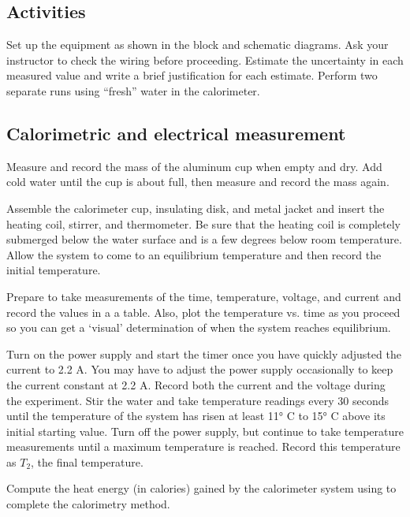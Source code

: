 \begin{multicols}{2}
\section{Activities}
Set up the equipment as shown in the block and schematic diagrams.  Ask your instructor to check the wiring before proceeding.  Estimate the uncertainty in each measured value and write a brief justification for each estimate. Perform two separate runs using ``fresh'' water in the calorimeter.

\subsection{Calorimetric and electrical measurement}

Measure and record the mass of the aluminum cup when empty and dry.
Add cold water until the cup is about  full, then measure and record the mass again.

Assemble the calorimeter cup, insulating disk, and metal jacket and insert the heating coil, stirrer, and thermometer.  Be sure that the heating coil is completely submerged below the water surface and is a few degrees below room temperature. Allow the system to come to an equilibrium temperature and then record the initial temperature.

Prepare to take measurements of the time, temperature, voltage, and current and record the values in a a table. Also, plot the temperature vs. time as you proceed so you can get a `visual' determination of when the system reaches equilibrium.

Turn on the power supply and start the timer once you have quickly adjusted the current to 2.2 A.  You may have to adjust the power supply occasionally to keep the current constant at 2.2 A.  Record both the current and the voltage during the experiment.  Stir the water and take temperature readings every 30 seconds until the temperature of the system has risen at least \ang{11} C to \ang{15} C above its initial starting value.  Turn off the power supply, but continue to take temperature measurements %
until a maximum temperature is reached. Record this temperature as $T_2$, the final temperature.

Compute the heat energy (in calories) gained by the calorimeter system using  to complete the calorimetry method. %


\end{multicols}
